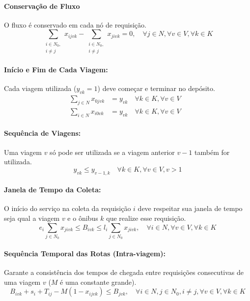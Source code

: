 \documentclass[12pt, a4paper]{article}
\begin{document}
\paragraph{Conservação de Fluxo} O fluxo é conservado em cada nó de requisição.
\begin{equation}
\sum_{\substack{i \in N_0,\\i \neq j}} x_{ijvk} - \sum_{\substack{i \in N_0,\\i \neq j}} x_{jivk} = 0, \quad \forall j \in N, \forall v \in V, \forall k \in K
\end{equation}

\paragraph{Início e Fim de Cada Viagem:} Cada viagem utilizada ($y_{vk} = 1$) deve começar e terminar no depósito.
\begin{align}
\sum_{j \in N} x_{0jvk} &= y_{vk} \quad \forall k \in K, \forall v \in V & \\
\sum_{i \in N} x_{i0vk} &= y_{vk} \quad \forall k \in K, \forall v \in V &
\end{align}

\paragraph{Sequência de Viagens:} Uma viagem $v$ só pode ser utilizada se a viagem anterior $v-1$ também for utilizada.
\begin{equation}
y_{vk} \le y_{v-1, k} \quad \forall k \in K, \forall v \in V, v > 1
\end{equation}

\paragraph{Janela de Tempo da Coleta:} O início do serviço na coleta da requisição $i$ deve respeitar sua janela de tempo seja qual a viagem $v$ e o ônibus $k$ que realize esse requisição.
\begin{equation}
e_i \sum_{j \in N_0} x_{jivk} \le B_{ivk} \le l_i \sum_{j \in N_0} x_{jivk}, \quad \forall i \in N, \forall v \in V, \forall k \in K
\end{equation}

\paragraph{Sequência Temporal das Rotas (Intra-viagem):} Garante a consistência dos tempos de chegada entre requisições consecutivas de uma viagem $v$ ($M$ é uma constante grande).
\begin{equation}
B_{ivk} + s_i + T_{ij} - M(1 - x_{ijvk}) \le B_{jvk}, \quad \forall i \in N, j \in N_0, i \neq j, \forall v \in V, \forall k \in K
\end{equation}
\end{document}
